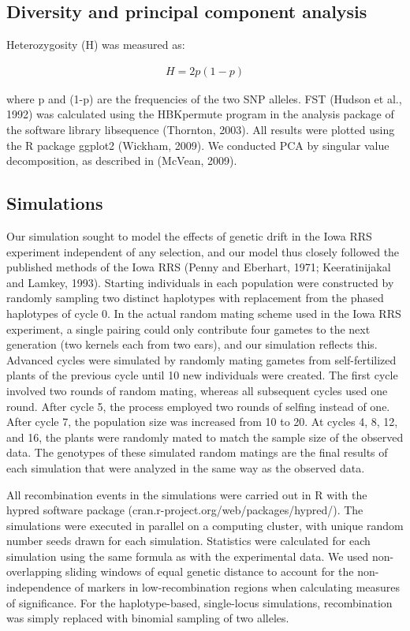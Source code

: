 \subsection*{Diversity and principal component analysis}
 Heterozygosity (H) was measured as:
	
\begin{align*}
H = 2p(1-p)
\end{align*}

where p and (1-p) are the frequencies of the two SNP alleles. FST (Hudson et al., 1992) was calculated using the HBKpermute program in the analysis package of the software library libsequence (Thornton, 2003). 
All results were plotted using the R package ggplot2 (Wickham, 2009). 
We conducted PCA by singular value decomposition, as described in (McVean, 2009). 

\subsection*{Simulations}  
Our simulation sought to model the effects of genetic drift in the Iowa RRS experiment independent of any selection, and our model thus closely followed the published methods of the Iowa RRS (Penny and Eberhart, 1971; Keeratinijakal and Lamkey, 1993). 
Starting individuals in each population were constructed by randomly sampling two distinct haplotypes with replacement from the phased haplotypes of cycle 0. 
In the actual random mating scheme used in the Iowa RRS experiment, a single pairing could only contribute four gametes to the next generation (two kernels each from two ears), and our simulation reflects this. 
Advanced cycles were simulated by randomly mating gametes from self-fertilized plants of the previous cycle until 10 new individuals were created. 
The first cycle involved two rounds of random mating, whereas all subsequent cycles used one round. 
After cycle 5, the process employed two rounds of selfing instead of one. 
After cycle 7, the population size was increased from 10 to 20. 
At cycles 4, 8, 12, and 16, the plants were randomly mated to match the sample size of the observed data. 
The genotypes of these simulated random matings are the final results of each simulation that were analyzed in the same way as the observed data. 

All recombination events in the simulations were carried out in R with the hypred software package (cran.r-project.org/web/packages/hypred/). The simulations were executed in parallel on a computing cluster, with unique random number seeds drawn for each simulation. Statistics were calculated for each simulation using the same formula as with the experimental data. We used non-overlapping sliding windows of equal genetic distance to account for the non-independence of markers in low-recombination regions when calculating measures of significance. For the haplotype-based, single-locus simulations, recombination was simply replaced with binomial sampling of two alleles.
